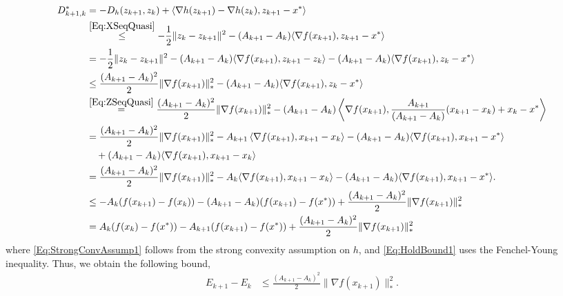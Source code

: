 \documentclass[11pt]{article}
\theoremstyle{plain}
\begin{document}
\begin{subequations}
\begin{align}
D^\ast_{k+1, k}  &= -D_h(z_{k+1}, z_k) +  \langle \nabla h(z_{k+1}) - \nabla h(z_k), z_{k+1} - x^\ast\rangle \label{Eq:Mirror}\\
&\overset{\eqref{Eq:XSeqQuasi}}{\leq} -\frac{1}{2}\|z_k - z_{k+1}\|^2 -(A_{k+1} -A_{k}) \langle \nabla f(x_{k+1}), z_{k+1} - x^\ast\rangle \label{Eq:StrongConvAssump1} \\
&= -\frac{1}{2}\|z_k - z_{k+1}\|^2 - (A_{k+1} -A_{k}) \langle \nabla f(x_{k+1}), z_{k+1} - z_k\rangle -(A_{k+1} -A_{k}) \langle \nabla f(x_{k+1}), z_k - x^\ast\rangle \notag\\
&\leq\frac{(A_{k+1} -A_{k})^2}{2} \|\nabla f(x_{k+1})\|_\ast^2 - (A_{k+1} -A_{k}) \langle \nabla f(x_{k+1}), z_k - x^\ast\rangle \label{Eq:HoldBound1}\\
& \overset{\eqref{Eq:ZSeqQuasi}}{=}\frac{(A_{k+1} -A_{k})^2}{2} \|\nabla f(x_{k+1})\|_\ast^2 - (A_{k+1} - A_k) \left\langle \nabla f(x_{k+1}), \frac{A_{k+1}}{(A_{k+1} -A_{k})}(x_{k+1} - x_k) + x_k - x^\ast\right\rangle \notag \\
& =\frac{(A_{k+1} -A_{k})^2}{2} \|\nabla f(x_{k+1})\|_\ast^2- A_{k+1} \left\langle \nabla f(x_{k+1}), x_{k+1} - x_k\right\rangle - (A_{k+1} -A_{k})\langle \nabla f(x_{k+1}), x_{k+1} - x^\ast\rangle \notag\\
&\quad + (A_{k+1} -A_{k})\langle \nabla f(x_{k+1}), x_{k+1} - x_k \rangle \notag\\
& = \frac{(A_{k+1} -A_{k})^2}{2} \|\nabla f(x_{k+1})\|_\ast^2- A_{k} \langle \nabla f(x_{k+1}), x_{k+1} - x_k\rangle  - (A_{k+1} -A_{k})\langle \nabla f(x_{k+1}), x_{k+1} - x^\ast\rangle. \notag\\
&\leq -A_k(f(x_{k+1}) - f(x_k)) - (A_{k+1} -A_{k})(f(x_{k+1}) - f(x^\ast)) + \frac{(A_{k+1} -A_{k})^2}{2} \|\nabla f(x_{k+1})\|_\ast^2 \notag\\
& = A_k (f(x_k) - f(x^\ast)) - A_{k+1}(f(x_{k+1}) - f(x^\ast)) + \frac{(A_{k+1} -A_{k})^2}{2} \|\nabla f(x_{k+1})\|_\ast^2 \notag
\end{align}
\end{subequations}
where \eqref{Eq:StrongConvAssump1} follows from the strong convexity assumption on $h$, and \eqref{Eq:HoldBound1} uses the Fenchel-Young inequality. Thus, we obtain the following bound,
\begin{subequations}
\begin{align*}
E_{k+1} - E_k &\leq  \frac{(A_{k+1} -A_{k})^2}{2} \|\nabla f(x_{k+1})\|_\ast^2. 
\end{align*}
\end{subequations}
\end{document}
